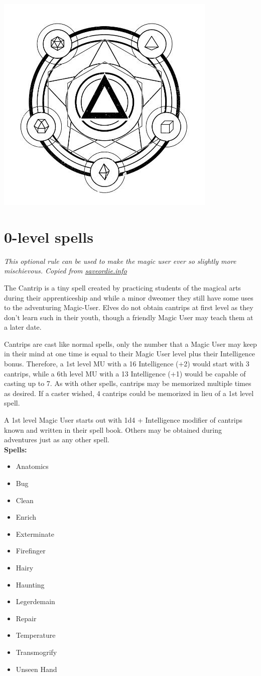 \documentclass[letterpaper,sansserif,tightsqueeze]{rpg-module}
\begin{document}
\vspace{0.5cm}

\begin{center}
	\includegraphics[width = 0.4\linewidth]{cantrip_logo.jpg}
\end{center}
\section{0-level spells}
\textit{This optional rule can be used to make the magic user ever so slightly more mischievous. Copied from \href{http://saveordie.info/?p=90}{saveordie.info}}

The Cantrip is a tiny spell created by practicing students of the magical arts during their apprenticeship and while a minor dweomer they still have some uses to the adventuring Magic-User. Elves do not obtain cantrips at first level as they don’t learn such in their youth, though a friendly Magic User may teach them at a later date.

Cantrips are cast like normal spells, only the number that a Magic User may keep in their mind at one time is equal to their Magic User level plus their Intelligence bonus. Therefore, a 1st level MU with a 16 Intelligence (+2) would start with 3 cantrips, while a 6th level MU with a 13 Intelligence (+1) would be capable of casting up to 7. As with other spells, cantrips may be memorized multiple times as desired. If a caster wished, 4 cantrips could be memorized in lieu of a 1st level spell.

A 1st level Magic User starts out with 1d4 + Intelligence modifier of cantrips known and written in their spell book. Others may be obtained during adventures just as any other spell.\\

\textbf{Spells:}
\begin{itemize}
	\item Anatomics
	\item Bug
	\item Clean
	\item Enrich
	\item Exterminate
	\item Firefinger
	\item Hairy
	\item Haunting
	\item Legerdemain
	\item Repair
	\item Temperature
	\item Transmogrify
	\item Unseen Hand
\end{itemize}
\end{document}
